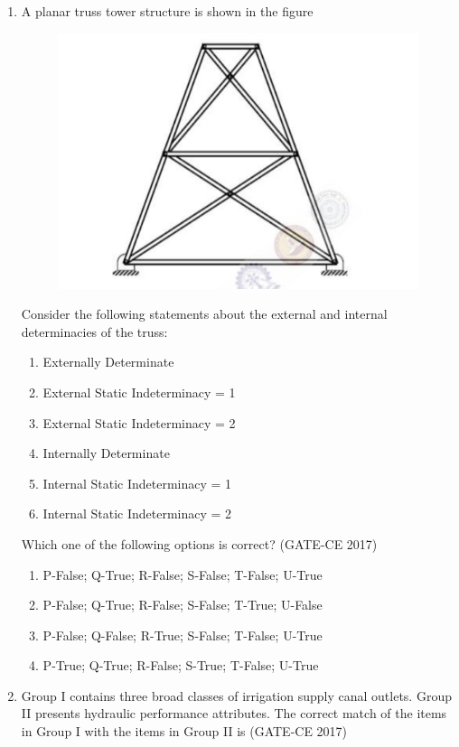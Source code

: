 \documentclass[journal,12pt,onecolumn]{article}
\theoremstyle{remark}
\begin{document}
\begin{enumerate}
    \item A planar truss tower structure is shown in the figure 
    \begin{figure}[H]
    \centering
    \includegraphics[width=0.7\columnwidth]{figs/imageq29.jpg}  
    \caption{}
    \label{fig:29}
    \end{figure} 
    Consider the following statements about the external and internal determinacies of the truss:
    \begin{enumerate}
        \item Externally Determinate
        \item External Static Indeterminacy = 1
        \item External Static Indeterminacy = 2
        \item Internally Determinate
        \item Internal Static Indeterminacy = 1
        \item Internal Static Indeterminacy = 2
    \end{enumerate}
    Which one of the following options is correct? \hfill (GATE-CE 2017)
    \begin{enumerate}
        \item P-False; Q-True; R-False; S-False; T-False; U-True
        \item P-False; Q-True; R-False; S-False; T-True; U-False
        \item P-False; Q-False; R-True; S-False; T-False; U-True
        \item P-True; Q-True; R-False; S-True; T-False; U-True
    \end{enumerate}

    \item Group I contains three broad classes of irrigation supply canal outlets. Group II presents hydraulic performance attributes. The correct match of the items in Group I with the items in Group II is \hfill (GATE-CE 2017)
    

\end{enumerate}
\end{document}
